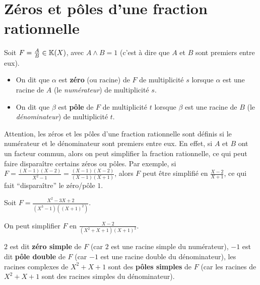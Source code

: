 \documentclass[12pt, a4paper]{report}
\begin{document}
\section{Zéros et pôles d'une fraction rationnelle}

\begin{definition}
    Soit $F = \frac AB \in \mathbb{K}(X)$, avec $A \wedge B = 1$ (c'est à dire que $A$ et $B$ sont premiers entre eux).

    \begin{itemize}
        \item On dit que $\alpha$ est \textbf{zéro} (ou racine) de $F$ de multiplicité $s$ lorsque $\alpha$ est une racine de $A$ (le \textit{numérateur}) de multiplicité $s$.
        \item On dit que $\beta$ est \textbf{pôle} de $F$ de multiplicité $t$ lorsque $\beta$ est une racine de $B$ (le \textit{dénominateur}) de multiplicité $t$.
    \end{itemize}
\end{definition}

\begin{attention}
    Attention, les zéros et les pôles d'une fraction rationnelle sont définis si le numérateur et le dénominateur sont premiers entre eux. En effet, si $A$ et $B$ ont un facteur commun, alors on peut simplifier la fraction rationnelle, ce qui peut faire disparaître certains zéros ou pôles. Par exemple, si $F = \frac{(X-1)(X-2)}{X^2-1} = \frac{(X-1)(X-2)}{(X-1)(X+1)}$, alors $F$ peut être simplifié en $\frac{X-2}{X+1}$, ce qui fait ``disparaître'' le zéro/pôle $1$.
\end{attention}

\begin{example}
    Soit $F = \frac{X^2 - 3X + 2}{(X^3-1)((X+1)^2)}$.

    On peut simplifier $F$ en $\frac{X-2}{(X^2+X+1)(X+1)^2}$.

    \begin{outline}
        \1 $2$ est dit \textbf{zéro simple} de $F$ (car $2$ est une racine simple du numérateur),
        \1 $-1$ est dit \textbf{pôle double} de $F$ (car $-1$ est une racine double du dénominateur),
        \1 les racines complexes de $X^2 + X + 1$ sont des \textbf{pôles simples} de $F$ (car les racines de $X^2 + X + 1$ sont des racines simples du dénominateur).
    \end{outline}
\end{example}
\end{document}
